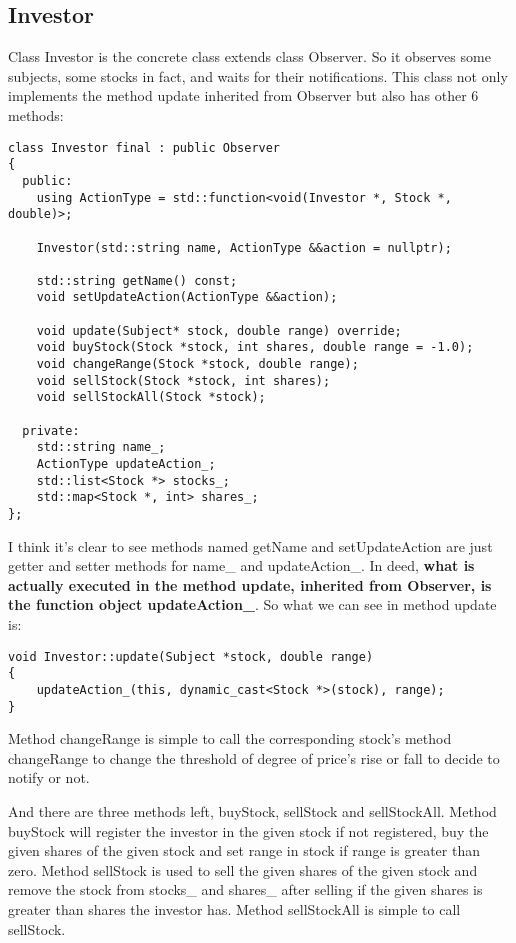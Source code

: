 \documentclass{article}
\begin{document}
\subsection{Investor}

    Class Investor is the concrete class extends class Observer. So it observes some subjects, some stocks in fact, and waits for their notifications. This class not only implements the method update inherited from Observer but also has other 6 methods:

\begin{lstlisting}
class Investor final : public Observer
{
  public:
    using ActionType = std::function<void(Investor *, Stock *, double)>;

    Investor(std::string name, ActionType &&action = nullptr);

    std::string getName() const;
    void setUpdateAction(ActionType &&action);

    void update(Subject* stock, double range) override;
    void buyStock(Stock *stock, int shares, double range = -1.0);
    void changeRange(Stock *stock, double range);
    void sellStock(Stock *stock, int shares);
    void sellStockAll(Stock *stock);

  private:
    std::string name_;
    ActionType updateAction_;
    std::list<Stock *> stocks_;
    std::map<Stock *, int> shares_;
};
\end{lstlisting}

    I think it's clear to see methods named getName and setUpdateAction are just getter and setter methods for name\_ and updateAction\_. In deed, \textbf{what is actually executed in the method update, inherited from Observer, is the function object updateAction\_}. So what we can see in method update is:

\begin{lstlisting}
void Investor::update(Subject *stock, double range)
{
    updateAction_(this, dynamic_cast<Stock *>(stock), range);
}
\end{lstlisting}

    Method changeRange is simple to call the corresponding stock's method changeRange to change the threshold of degree of price's rise or fall to decide to notify or not.

    And there are three methods left, buyStock, sellStock and sellStockAll. Method buyStock will register the investor in the given stock if not registered, buy the given shares of the given stock and set range in stock if range is greater than zero. Method sellStock is used to sell the given shares of the given stock and remove the stock from stocks\_ and shares\_ after selling if the given shares is greater than shares the investor has. Method sellStockAll is simple to call sellStock.
\end{document}
